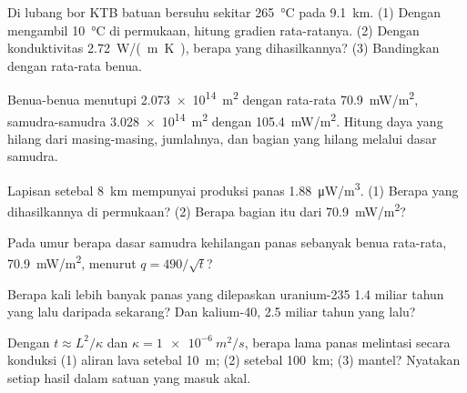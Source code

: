 \begin{exercise}[$\star\star$]\label{exo:g12:internal-heat:6}
Di lubang bor KTB batuan bersuhu sekitar \qty{265}{\celsius} pada
\qty{9.1}{km}. (1) Dengan mengambil \qty{10}{\celsius} di permukaan, hitung
gradien rata-ratanya. (2) Dengan konduktivitas \qty{2.72}{W/(m.K)}, berapa
 yang dihasilkannya? (3) Bandingkan dengan rata-rata benua.
\end{exercise}

\begin{exercise}[$\star\star$]\label{exo:g12:internal-heat:7}
Benua-benua menutupi \qty{2.073e14}{m^2} dengan  rata-rata
\qty{70.9}{mW/m^2}, samudra-samudra \qty{3.028e14}{m^2} dengan
\qty{105.4}{mW/m^2}. Hitung daya yang hilang dari masing-masing, jumlahnya,
dan bagian yang hilang melalui dasar samudra.
\end{exercise}

\begin{exercise}[$\star\star$]\label{exo:g12:internal-heat:8}
Lapisan  setebal \qty{8}{km} mempunyai produksi panas
\qty{1.88}{\micro W/m^3}. (1) Berapa  yang dihasilkannya di
permukaan? (2) Berapa bagian itu dari \qty{70.9}{mW/m^2}?
\end{exercise}

\begin{exercise}[$\star\star$]\label{exo:g12:internal-heat:9}
Pada umur berapa dasar samudra kehilangan panas sebanyak benua rata-rata,
\qty{70.9}{mW/m^2}, menurut $q = 490/\sqrt{t}$?
\end{exercise}

\begin{exercise}[$\star\star$]\label{exo:g12:internal-heat:10}
Berapa kali lebih banyak panas yang dilepaskan uranium-235 1.4 miliar tahun
yang lalu daripada sekarang? Dan kalium-40, 2.5 miliar tahun yang lalu?
\end{exercise}

\begin{exercise}[$\star\star$]\label{exo:g12:internal-heat:11}
Dengan $t \approx L^2/\kappa$ dan $\kappa = \qty{1e-6}{m^2/s}$, berapa lama
panas melintasi secara konduksi (1) aliran lava setebal \qty{10}{m};
(2)  setebal \qty{100}{km}; (3) mantel? Nyatakan setiap hasil dalam
satuan yang masuk akal.
\end{exercise}

